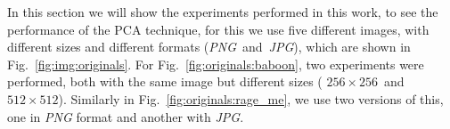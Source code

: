\documentclass[journal]{IEEEtran}
\begin{document}
In this section we will show the experiments performed in this work, to see the performance of the PCA technique, for this we use five different images, with different sizes and different formats (\textit{PNG}~and~\textit{JPG}), which are shown in Fig.~\ref{fig:img:originals}. For Fig.~\ref{fig:originals:baboon}, two experiments were performed, both with the same image but different sizes ( $256\times 256$~and~$512\times 512$). Similarly in Fig.~\ref{fig:originals:rage_me}, we use two versions of this, one in  \textit{PNG} format and another with \textit{JPG}.
\end{document}
